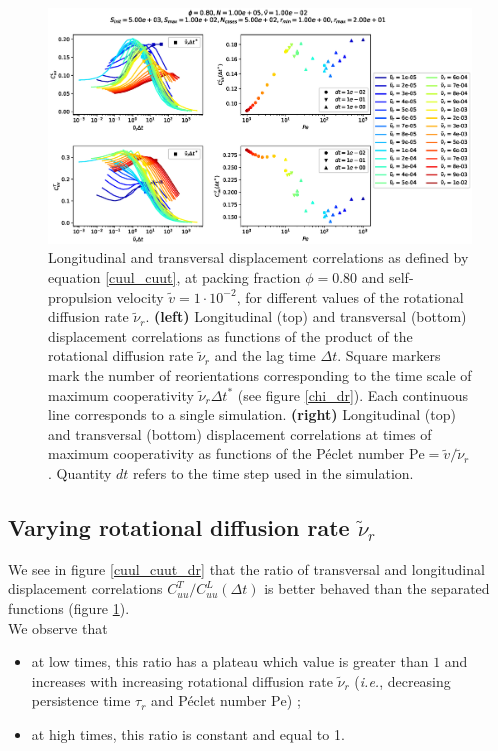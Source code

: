 \documentclass[class=report, float=false, crop=false]{standalone}
\begin{document}
\begin{figure}[h!]
\centering
\includegraphics[width=\textwidth]{figures/figs/CuuLCuuT_Dk8000_Vj1000_Nq1000_Io5000_Mn1000_Cn5000_separate.eps}
\caption{Longitudinal and transversal displacement correlations as defined by equation \ref{cuul_cuut}, at packing fraction $\phi=0.80$ and self-propulsion velocity $\tilde{v}=1\cdot10^{-2}$, for different values of the rotational diffusion rate $\tilde{\nu}_r$. \textbf{(left)} Longitudinal (top) and transversal (bottom) displacement correlations as functions of the product of the rotational diffusion rate $\tilde{\nu}_r$ and the lag time $\Delta t$. Square markers mark the number of reorientations corresponding to the time scale of maximum cooperativity $\tilde{\nu}_r \Delta t^*$ (see figure \ref{chi_dr}). Each continuous line corresponds to a single simulation. \textbf{(right)} Longitudinal (top) and transversal (bottom) displacement correlations at times of maximum cooperativity as functions of the P\'eclet number $\text{Pe} = \tilde{v}/\tilde{\nu}_r$. Quantity $dt$ refers to the time step used in the simulation.}
\label{cuul_cuut_separate}
\end{figure}

\subsection{Varying rotational diffusion rate $\tilde{\nu}_r$}

We see in figure \ref{cuul_cuut_dr} that the ratio of transversal and longitudinal displacement correlations $C_{uu}^T/C_{uu}^L(\Delta t)$ is better behaved than the separated functions (figure \ref{cuul_cuut_separate}).\\

We observe that
\begin{itemize}
  \item at low times, this ratio has a plateau which value is greater than $1$ and increases with increasing rotational diffusion rate $\tilde{\nu}_r$ (\textit{i.e.}, decreasing persistence time $\tau_r$ and P\'eclet number $\text{Pe}$) ;
  \item at high times, this ratio is constant and equal to 1.\\
\end{itemize}
\end{document}

